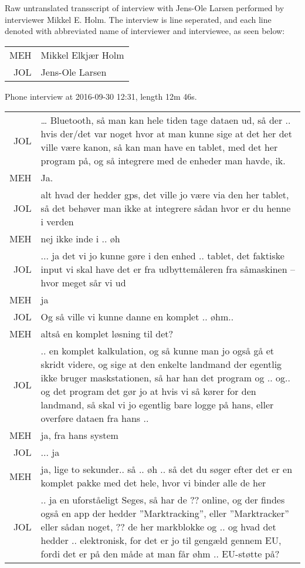 Raw untranslated transscript of interview with Jens-Ole Larsen performed by interviewer Mikkel E. Holm.
The interview is line seperated, and each line denoted with abbreviated name of interviewer and interviewee, as seen below:

\begin{longtable}{ r | p{13.5cm} }
    MEH & Mikkel Elkjær Holm\\
    JOL & Jens-Ole Larsen
\end{longtable}

Phone interview at 2016-09-30 12:31, length 12m 46s.
\label{transscript:jens_ole}
\begin{longtable}{ r | p{13.5cm} }
    JOL & … Bluetooth, så man kan hele tiden tage dataen ud, så der .. hvis der/det var noget hvor at man kunne sige at det her det ville være kanon, så kan man have en tablet, med det her program på, og så integrere med de enheder man havde, ik.\\
    MEH & Ja.\\
    JOL & alt hvad der hedder gps, det ville jo være via den her tablet, så det behøver man ikke at integrere sådan hvor er du henne i verden\\
    MEH & nej ikke inde i .. øh\\
    JOL & ... ja det vi jo kunne gøre i den enhed .. tablet, det faktiske input vi skal have det er fra udbyttemåleren fra såmaskinen – hvor meget sår vi ud\\
    MEH & ja\\
    JOL & Og så ville vi kunne danne en komplet .. øhm.. \\
    MEH & altså en komplet løsning til det? \\
    JOL & .. en komplet kalkulation, og så kunne man jo også gå et skridt videre, og sige at den enkelte landmand der egentlig ikke bruger maskstationen, så har han det program og .. og.. og det program det gør jo at hvis vi så kører for den landmand, så skal vi jo egentlig bare logge på hans, eller overføre dataen fra hans .. \\
    MEH & ja, fra hans system \\
    JOL & ... ja \\
    MEH & ja, lige to sekunder.. så .. øh .. så det du søger efter det er en komplet pakke med det hele, hvor vi binder alle de her \\
    JOL & .. ja en {uforståeligt} Seges, så har de {??} online, og der findes også en app der hedder ”Marktracking”, eller ”Marktracker” eller sådan noget, {??} de her markblokke og .. og hvad det hedder .. elektronisk, for det er jo til gengæld gennem EU, fordi det er på den måde at man får øhm .. EU-støtte på{?} \\

\end{longtable}

